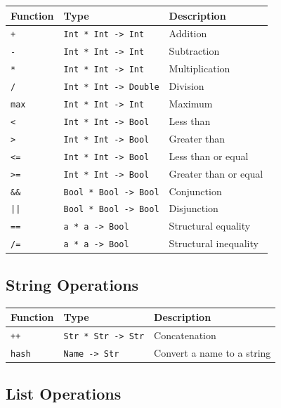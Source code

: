 \documentclass[11pt,a4paper]{article}
\begin{document}
\begin{center}
\begin{tabular}{lll}
\toprule
\textbf{Function} & \textbf{Type} & \textbf{Description} \\
\midrule
\texttt{+}   & \texttt{Int * Int -> Int}    & Addition \\
\texttt{-}   & \texttt{Int * Int -> Int}    & Subtraction \\
\texttt{*}   & \texttt{Int * Int -> Int}    & Multiplication \\
\texttt{/}   & \texttt{Int * Int -> Double} & Division \\
\texttt{max} & \texttt{Int * Int -> Int}    & Maximum \\
\texttt{<}   & \texttt{Int * Int -> Bool}   & Less than \\
\texttt{>}   & \texttt{Int * Int -> Bool}   & Greater than \\
\texttt{<=}  & \texttt{Int * Int -> Bool}   & Less than or equal \\
\texttt{>=}  & \texttt{Int * Int -> Bool}   & Greater than or equal \\
\texttt{\&\&} & \texttt{Bool * Bool -> Bool} & Conjunction \\
\texttt{||}  & \texttt{Bool * Bool -> Bool} & Disjunction \\
\texttt{==}  & \texttt{a * a -> Bool}       & Structural equality \\
\texttt{/=}  & \texttt{a * a -> Bool}       & Structural inequality \\
\bottomrule
\end{tabular}
\end{center}

\subsection{String Operations}

\begin{center}
\begin{tabular}{lll}
\toprule
\textbf{Function} & \textbf{Type} & \textbf{Description} \\
\midrule
\texttt{++}   & \texttt{Str * Str -> Str} & Concatenation \\
\texttt{hash} & \texttt{Name -> Str}      & Convert a name to a string \\
\bottomrule
\end{tabular}
\end{center}

\subsection{List Operations}
\end{document}

